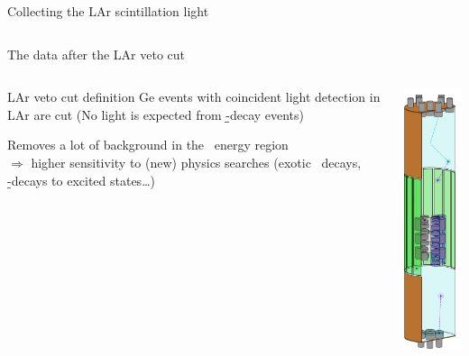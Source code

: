 \documentclass[10pt,aspectratio=169]{beamer}
\begin{document}
\begin{frame}{Collecting the LAr scintillation light}
\begin{columns}
\begin{tikzpicture}
        \end{tikzpicture}
  \end{columns}
\end{frame}
\begin{frame}{The data after the LAr veto cut}
  \begin{columns}
    \begin{column}{0.7\textwidth}\setlength{\parskip}{10pt}%
      \begin{exampleblock}{LAr veto cut definition}
        Ge events with coincident light detection in LAr are cut (No light is
        expected from \b\b-decay events)
      \end{exampleblock}

      Removes a lot of background in the \nnbb\ energy region \\
      $\Rightarrow$ \alert{higher sensitivity to (new) physics searches}
      (exotic \nnbb\ decays, \b\b-decays to excited states\ldots)
    \end{column}
    \begin{column}{0.3\textwidth}\centering
      \includegraphics[width=3cm,clip,trim=0 220 0 0]{setup/lar-veto-tikz.pdf}
    \end{column}
  \end{columns}
\end{frame}
\end{document}

